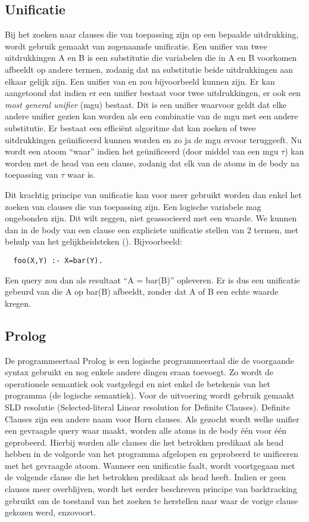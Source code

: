 \subsection{Unificatie}
Bij het zoeken naar clauses die van toepassing zijn op een bepaalde uitdrukking, wordt gebruik gemaakt van zogenaamde unificatie. Een unifier van twee uitdrukkingen A en B is een substitutie die variabelen die in A en B voorkomen afbeeldt op andere termen, zodanig dat na substitutie beide uitdrukkingen aan elkaar gelijk zijn. Een unifier van  en  zou bijvoorbeeld  kunnen zijn. Er kan aangetoond dat indien er een unifier bestaat voor twee uitdrukkingen, er ook een {\em most general unifier} (mgu) bestaat. Dit is een unifier waarvoor geldt dat elke andere unifier gezien kan worden als een combinatie van de mgu met een andere substitutie. Er bestaat een effici\"ent algoritme dat kan zoeken of twee uitdrukkingen ge\"unificeerd kunnen worden en zo ja de mgu ervoor teruggeeft. Nu wordt een atoom ``waar'' indien het ge\"unificeerd (door middel van een mgu $\tau$) kan worden met de head van een clause, zodanig dat elk van de atoms in de body na toepassing van $\tau$ waar is.

Dit krachtig principe van unificatie kan voor meer gebruikt worden dan enkel het zoeken van clauses die van toepassing zijn. Een logische variabele mag ongebonden zijn. Dit wilt zeggen, niet geassocieerd met een waarde. We kunnen dan in de body van een clause een expliciete unificatie stellen van 2 termen, met behulp van het gelijkheidsteken (\code{=}). Bijvoorbeeld: \begin{Verbatim}
  foo(X,Y) :- X=bar(Y).
\end{Verbatim}
Een query  zou dan als resultaat ``A = bar(B)'' opleveren. Er is dus een unificatie gebeurd van die A op bar(B) afbeeldt, zonder dat A of B een echte waarde kregen.

\subsection{Prolog}
De programmeertaal Prolog is een logische programmeertaal die de voorgaande syntax gebruikt en nog enkele andere dingen eraan toevoegt. Zo wordt de operationele semantiek ook vastgelegd en niet enkel de betekenis van het programma (de logische semantiek). Voor de uitvoering wordt gebruik gemaakt SLD resolutie (Selected-literal Linear resolution for Definite Clauses). Definite Clauses zijn een andere naam voor Horn clauses. Als gezocht wordt welke unifier een gevraagde query waar maakt, worden alle atoms in de body \'e\'en voor \'e\'en geprobeerd. Hierbij worden alle clauses die het betrokken predikaat als head hebben in de volgorde van het programma afgelopen en geprobeerd te unificeren met het gevraagde atoom. Wanneer een unificatie faalt, wordt voortgegaan met de volgende clause die het betrokken predikaat als head heeft. Indien er geen clauses meer overblijven, wordt het eerder beschreven principe van backtracking gebruikt om de toestand van het zoeken te herstellen naar waar de vorige clause gekozen werd, enzovoort.

